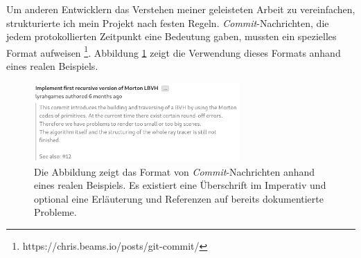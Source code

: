 \documentclass[crop=false]{standalone}
\begin{document}
    Um anderen Entwicklern das Verstehen meiner geleisteten Arbeit zu vereinfachen, strukturierte ich mein Projekt nach festen Regeln.
    \textit{Commit}-Nachrichten, die jedem protokollierten Zeitpunkt eine Bedeutung gaben, mussten ein spezielles Format aufweisen%
    \footnote{https://chris.beams.io/posts/git-commit/}.
    Abbildung \ref{fig:commit-message-example} zeigt die Verwendung dieses Formats anhand eines realen Beispiels.
    \begin{figure}
      \center
      \includegraphics[width=0.7\textwidth]{images/commit_message_example.png}
      \caption{%
        Die Abbildung zeigt das Format von \textit{Commit}-Nachrichten anhand eines realen Beispiels.
        Es existiert eine Überschrift im Imperativ und optional eine Erläuterung und Referenzen auf bereits dokumentierte Probleme.
      }
      \label{fig:commit-message-example}
    \end{figure}
\end{document}
